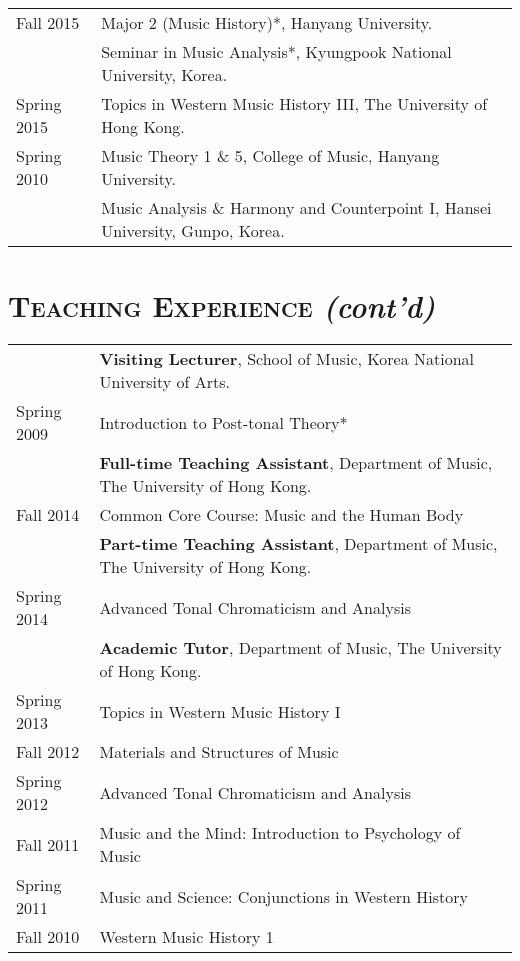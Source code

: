 \documentclass[letter,11pt]{article}
\begin{document}
\begin{tabular}{p{2.5cm} l}
    Fall 2015 & Major 2 (Music History)*, Hanyang University.\\
    & Seminar in Music Analysis*, Kyungpook National University, Korea.\\
    
    Spring 2015 & Topics in Western Music History III, The University of Hong Kong.\\
    
    Spring 2010 & Music Theory 1 \& 5, College of Music, Hanyang University.\\
    & Music Analysis \& Harmony and Counterpoint I, Hansei University, Gunpo, Korea.
  \end{tabular}
  
  \section*{\textsc{Teaching Experience} \textit{(cont'd)}}
  
  \hspace*{-0.25cm}
  \begin{tabular}{p{2.5cm} l}
	& \textbf{Visiting Lecturer}, School of Music, Korea National University of Arts.\\
	Spring 2009 & Introduction to Post-tonal Theory*\\[2mm]
	
    & \textbf{Full-time Teaching Assistant}, Department of Music, The University of Hong Kong.\\
    Fall 2014 & Common Core Course: Music and the Human Body\\[2mm]
    
    & \textbf{Part-time Teaching Assistant}, Department of Music, The University of Hong Kong.\\
    Spring 2014 & Advanced Tonal Chromaticism and Analysis\\[2mm]
    
    & \textbf{Academic Tutor}, Department of Music, The University of Hong Kong.\\
    Spring 2013 & Topics in Western Music History I\\
    Fall 2012 & Materials and Structures of Music\\
    Spring 2012 & Advanced Tonal Chromaticism and Analysis\\
    Fall 2011 & Music and the Mind: Introduction to Psychology of Music\\
    Spring 2011 & Music and Science: Conjunctions in Western History\\
    Fall 2010 & Western Music History 1
  \end{tabular}
  
\end{document}
